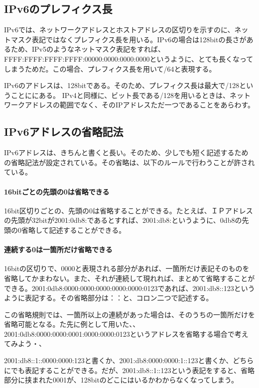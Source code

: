 \subsection{IPv6のプレフィクス長}
IPv6では、ネットワークアドレスとホストアドレスの区切りを示すのに、ネットマスク表記ではなくプレフィクス長を用いる。IPv6の場合は128bitの長さがあるため、IPv5のようなネットマスク表記をすれば、FFFF:FFFF:FFFF:FFFF:00000:0000:0000:0000というように、とても長くなってしまうためだ。この場合、プレフィクス長を用いて/64と表現する。

IPv6のアドレスは、128bitである。そのため、プレフィクス長は最大で/128ということににある。
IPv4と同様に、ビット長である/128を用いるときは、ネットワークアドレスの範囲でなく、そのIPアドレスただ一つであることをあらわす。


\subsection{IPv6アドレスの省略記法}
IPv6アドレスは、きちんと書くと長い。そのため、少しでも短く記述するための省略記法が設定されている。その省略は、以下のルールで行わうことが許されている。

\paragraph{16bitごとの先頭の0は省略できる}
16bit区切りごとの、先頭の0は省略することができる。たとえば、ＩＰアドレスの先頭が32bitが2001:0db8:であるとすれば、2001:db8:というように、0db8の先頭の0省略して記述することができる。

\paragraph{連続する0は一箇所だけ省略できる}
16bitの区切りで、0000と表現される部分があれば、一箇所だけ表記そのものを省略してかまわない。また、それが連続して現れれば、まとめて省略することができる。2001:0db8:0000:0000:0000:0000:0000:0123であれば、2001:db8::123というように表記する。その省略部分は：：と、コロン二つで記述する。

この省略規則では、一箇所以上の連続があった場合は、そのうちの一箇所だけを省略可能となる。た先に例として用いた、、2001:0db8:0000:0000:0001:0000:0000:0123というアドレスを省略する場合で考えてみよう・、

2001:db8::1::0000:0000:123と書くか、2001:db8:0000:0000:1::123と書くか、どちらにでも表記することができる。だが、2001:db8::1::123という表記をすると、省略部分に挟まれた0001が、128bitのどこにはいるかわからなくなってしまう。

